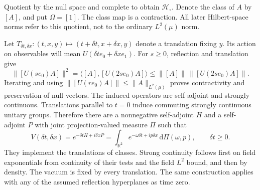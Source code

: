 \documentclass[11pt, letterpaper, reqno]{amsart}
\theoremstyle{definition}
\theoremstyle{remark}
\newcommand{\bbR}{\mathbb{R}}
\newcommand{\calH}{\mathcal{H}}
\newcommand{\dd}{\,\mathrm{d}}
\begin{document}
Quotient by the null space and complete to obtain $\calH_\circ$.
Denote the class of $A$ by $[A]$, and put $\Omega=[1]$. The class map
is a contraction. All later Hilbert-space norms refer to this quotient,
not to the ordinary $L^2(\mu)$ norm.

Let $T_{\delta t,\delta x}:(t,x,y)\mapsto
(t+\delta t,x+\delta x,y)$ denote a translation fixing $y$.
Its action on observables will mean $U(\delta t e_0+\delta x e_1)$.
For $s\geq0$, reflection and translation give
\begin{equation}
 \|[U(se_0)A]\|^2=\langle[A],[U(2se_0)A]\rangle
 \leq\|[A]\|\,\|[U(2se_0)A]\|.
\end{equation}
Iterating and using $\|[U(re_0)A]\|\leq\|A\|_{L^2(\mu)}$ proves
contractivity and preservation of null vectors. The induced operators
are self-adjoint and strongly continuous. Translations parallel to
$t=0$ induce commuting strongly continuous unitary groups. Therefore
there are a nonnegative self-adjoint $H$ and a self-adjoint $P$ with
joint projection-valued measure $\Pi$ such that
\begin{equation}\label{eq:spectral-translations}
 V(\delta t,\delta x)=e^{-\delta tH+i\delta xP}
 =\int_{\bbR^2}e^{-\omega\delta t+ip\delta x}\dd\Pi(\omega,p),
 \qquad\delta t\geq0.
\end{equation}
They implement the translations of classes. Strong continuity follows
first on field exponentials from continuity of their tests and the
field $L^2$ bound, and then by density. The vacuum is fixed by every
translation. The same construction applies with any of the assumed
reflection hyperplanes as time zero.
\end{document}
